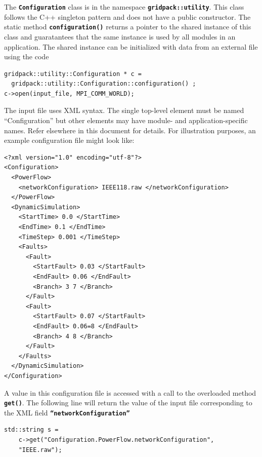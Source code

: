 \documentclass[12pt]{report} %
\begin{document}
The \texttt{\textbf{Configuration}} class is in the namespace \texttt{\textbf{gridpack::utility}}. This class follows the C++ singleton pattern and does not have a public constructor. The static method \texttt{\textbf{configuration()}} returns a pointer to the shared instance of this class and guaratantees that the same instance is used by all modules in an application. The shared instance can be initialized with data from an external file using the code

{
\color{red}
\begin{Verbatim}[fontseries=b]
gridpack::utility::Configuration * c = 
  gridpack::utility::Configuration::configuration() ; 
c->open(input_file, MPI_COMM_WORLD);
\end{Verbatim}
}

The input file uses XML syntax. The single top-level element must be named ``Configuration'' but other elements may have module- and application-specific names. Refer elsewhere in this document for details.  For illustration purposes, an example configuration file might look like: 

{
\color{blue}
\bfseries
\begin{Verbatim}[commandchars=\\\{\}]
<?xml version="1.0" encoding="utf-8"?>
<Configuration>
  <PowerFlow>
    <networkConfiguration> IEEE118.raw </networkConfiguration>
  </PowerFlow>
  <DynamicSimulation>
    <StartTime> 0.0 </StartTime>
    <EndTime> 0.1 </EndTime>
    <TimeStep> 0.001 </TimeStep>
    <Faults>
      <Fault>
        <StartFault> 0.03 </StartFault>
        <EndFault> 0.06 </EndFault>
        <Branch> 3 7 </Branch>
      </Fault>
      <Fault>
        <StartFault> 0.07 </StartFault>
        <EndFault> 0.06=8 </EndFault>
        <Branch> 4 8 </Branch>
      </Fault>
    </Faults>
  </DynamicSimulation>
</Configuration>
\end{Verbatim}
}

A value in this configuration file is accessed with a call to the overloaded method \texttt{\textbf{get()}}. The following line will return the value of the input file corresponding to the XML field \texttt{\textbf{``networkConfiguration''}}

{
\color{red}
\begin{Verbatim}[fontseries=b]
std::string s = 
    c->get("Configuration.PowerFlow.networkConfiguration",  
    "IEEE.raw");
\end{Verbatim}
}
\end{document}
